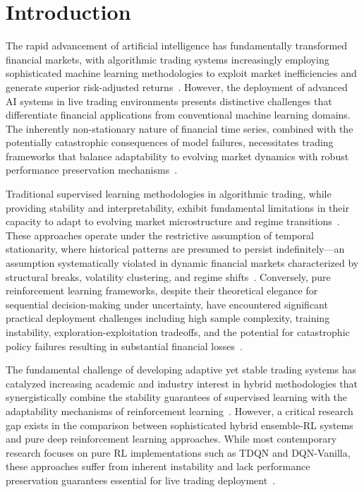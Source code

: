\documentclass[10pt,twocolumn]{article}
\begin{document}
\section{Introduction}

The rapid advancement of artificial intelligence has fundamentally transformed financial markets, with algorithmic trading systems increasingly employing sophisticated machine learning methodologies to exploit market inefficiencies and generate superior risk-adjusted returns~\cite{lopez2019machine}. However, the deployment of advanced AI systems in live trading environments presents distinctive challenges that differentiate financial applications from conventional machine learning domains. The inherently non-stationary nature of financial time series, combined with the potentially catastrophic consequences of model failures, necessitates trading frameworks that balance adaptability to evolving market dynamics with robust performance preservation mechanisms~\cite{cont2001empirical}.

Traditional supervised learning methodologies in algorithmic trading, while providing stability and interpretability, exhibit fundamental limitations in their capacity to adapt to evolving market microstructure and regime transitions~\cite{tsay2010analysis}. These approaches operate under the restrictive assumption of temporal stationarity, where historical patterns are presumed to persist indefinitely---an assumption systematically violated in dynamic financial markets characterized by structural breaks, volatility clustering, and regime shifts~\cite{hamilton2008regime}. Conversely, pure reinforcement learning frameworks, despite their theoretical elegance for sequential decision-making under uncertainty, have encountered significant practical deployment challenges including high sample complexity, training instability, exploration-exploitation tradeoffs, and the potential for catastrophic policy failures resulting in substantial financial losses~\cite{deng2016deep}.

The fundamental challenge of developing adaptive yet stable trading systems has catalyzed increasing academic and industry interest in hybrid methodologies that synergistically combine the stability guarantees of supervised learning with the adaptability mechanisms of reinforcement learning~\cite{silver2016mastering}. However, a critical research gap exists in the comparison between sophisticated hybrid ensemble-RL systems and pure deep reinforcement learning approaches. While most contemporary research focuses on pure RL implementations such as TDQN and DQN-Vanilla, these approaches suffer from inherent instability and lack performance preservation guarantees essential for live trading deployment~\cite{aldridge2013high}.
\end{document}
